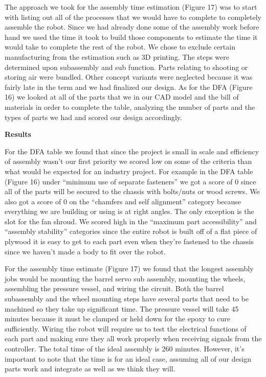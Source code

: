 \documentclass[12pt,letterpaper,titlepage]{article}
\begin{document}
The approach we took for the assembly time estimation (Figure 17) was to start with listing out all of the processes that we would have to complete to completely assemble the robot. Since we had already done some of the assembly work before hand we used the time it took to build those components to estimate the time it would take to complete the rest of the robot. We chose to exclude certain manufacturing from the estimation such as 3D printing. The steps were determined upon subassembly and sub function. Parts relating to shooting or storing air were bundled. Other concept variants were neglected because it was fairly late in the term and we had finalized our design. As for the DFA (Figure 16) we looked at all of the parts that we in our CAD model and the bill of materials in order to complete the table, analyzing the number of parts and the types of parts we had and scored our design accordingly. 

\smallskip\noindent\textbf{Results}

For the DFA table we found that since the project is small in scale and efficiency of assembly wasn't our first priority we scored low on some of the criteria than what would be expected for an industry project. For example in the DFA table (Figure 16) under “minimum use of separate fasteners” we got a score of 0 since all of the parts will be secured to the chassis with bolts/nuts or wood screws. We also got a score of 0 on the “chamfers and self alignment” category because everything we are building or using is at right angles. The only exception is the slot for the fan shroud. We scored high in the “maximum part accessibility” and “assembly stability” categories since the entire robot is built off of a flat piece of plywood it is easy to get to each part even when they're fastened to the chassis since we haven't made a body to fit over the robot.

For the assembly time estimate (Figure 17) we found that the longest assembly jobs would be mounting the barrel servo sub assembly, mounting the wheels, assembling the pressure vessel, and wiring the circuit. Both the barrel subassembly and the wheel mounting steps have several parts that need to be machined so they take up significant time. The pressure vessel will take 45 minutes because it must be clamped or held down for the epoxy to cure sufficiently. Wiring the robot will require us to test the electrical functions of each part and making sure they all work properly when receiving signals from the controller. The total time of the ideal assembly is 260 minutes. However, it's important to note that the time is for an ideal case, assuming all of our design parts work and integrate as well as we think they will.
\end{document}
